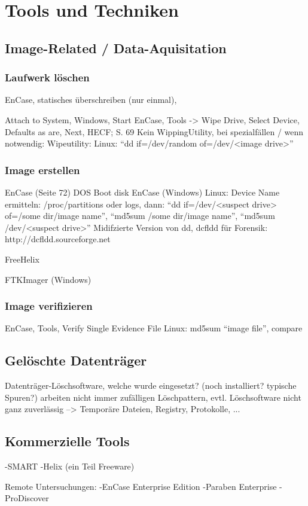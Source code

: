 \chapter{Tools und Techniken}

\section{Image-Related / Data-Aquisitation}
\subsection{Laufwerk löschen}
EnCase, statisches überschreiben (nur einmal), 

Attach to System, Windows, Start EnCase, Tools -> Wipe Drive, Select Device, Defaults as are, Next, HECF; S. 69
Kein WippingUtility, bei spezialfällen / wenn notwendig: Wipeutility: Linux: "`dd if=/dev/random of=/dev/<image drive>"'


\subsection{Image erstellen}
EnCase (Seite 72) DOS Boot disk
EnCase (Windows)
Linux: Device Name ermitteln: /proc/partitions oder logs, dann: "`dd if=/dev/<suspect drive> of=/some dir/image name"', "`md5sum /some dir/image name"', "`md5sum /dev/<suspect drive>"'
Midifzierte Version von dd, dcfldd für Forensik: http://dcfldd.sourceforge.net

FreeHelix

FTKImager (Windows)

\subsection{Image verifizieren}
EnCase, Tools, Verify Single Evidence File
Linux: md5sum "`image file"', compare


\section{Gelöschte Datenträger}
Datenträger-Löschsoftware, welche wurde eingesetzt? (noch installiert? typische Spuren?) arbeiten nicht immer zufälligen Löschpattern, evtl. Löschsoftware nicht ganz zuverlässig --> Temporäre Dateien, Registry, Protokolle, ...

\section{Kommerzielle Tools}
-SMART
-Helix (ein Teil Freeware)

Remote Untersuchungen:
-EnCase Enterprise Edition
-Paraben Enterprise
-ProDiscover